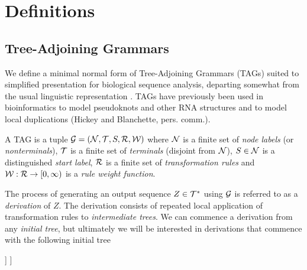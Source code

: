 \documentclass[10pt]{article}
\begin{document}
\section{Definitions}

\subsection{Tree-Adjoining Grammars}

We define a minimal normal form of Tree-Adjoining Grammars (TAGs)
suited to simplified presentation for biological sequence analysis,
departing somewhat from the usual linguistic representation \cite{JoshiSchabes97}.
TAGs have previously been used in bioinformatics
to model pseudoknots and other RNA structures \cite{MatsuiEtAl2005,ChiangJoshiSearls2006}
and to model local duplications (Hickey and Blanchette, pers. comm.).

\newcommand\grammar{{\cal G}}
\newcommand\nodelabels{{\cal N}}
\newcommand\terminals{{\cal T}}
\newcommand\startsymbol{S}
\newcommand\rules{{\cal R}}
\newcommand\weight{{\cal W}}

A TAG is a tuple $\grammar=(\nodelabels,\terminals,\startsymbol,\rules,\weight)$ where
$\nodelabels$ is a finite set of {\em node labels} (or {\em nonterminals}),
$\terminals$ is a finite set of {\em terminals} (disjoint from $\nodelabels$),
$\startsymbol \in \nodelabels$ is a distinguished {\em start label},
$\rules$ is a finite set of {\em transformation rules}
and $\weight:\rules \to [0,\infty)$ is a {\em rule weight function}.

\newcommand\outseq{Z}
\newcommand\outsubseq[2]{\outseq[#1 \ldots #2]}

The process of generating an output sequence $\outseq \in \terminals^\ast$ using $\grammar$
is referred to as a {\em derivation} of $\outseq$.
The derivation consists of repeated local application of transformation rules to {\em intermediate trees}.
We can commence a derivation from any {\em initial tree}, but ultimately we will be interested in derivations that commence with the following initial tree

\newcommand\lineartree[3]{\Tree[ .$#1$ [ .$#2$ [ .$#3$ ] ] ]}
\newcommand\inittree[1]{\lineartree{\epsilon}{#1}{\epsilon}}

\inittree{\startsymbol}

\newcommand\rulesubset[2]{\rules_{#1}(#2)}


\newcommand\abtree[1]{\lineartree{\alpha}{#1}{\beta}}
\newcommand\lhs{\abtree{A}}
\end{document}
